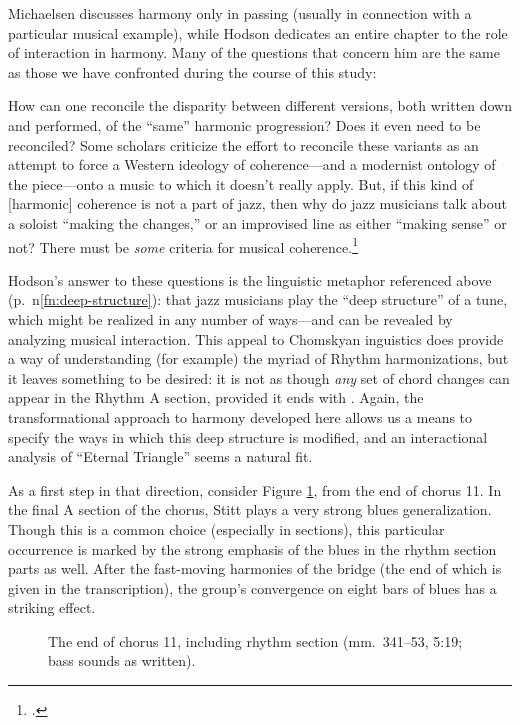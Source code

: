 Michaelsen discusses harmony only in passing (usually in connection with a
particular musical example), while Hodson dedicates an entire chapter to the
role of interaction in harmony. Many of the questions that concern
him are the same as those we have confronted during the course of this study:
\begin{quoting}
  \singlespacing
  How can one reconcile the disparity between different versions, both written
  down and performed, of the ``same'' harmonic progression? Does it even need
  to be reconciled? Some scholars criticize the effort to reconcile these
  variants as an attempt to force a Western ideology of coherence---and a
  modernist ontology of the piece---onto a music to which it doesn't really
  apply. But, if this kind of [harmonic] coherence is not a part of jazz, then
  why do jazz musicians talk about a soloist ``making the changes,'' or an
  improvised line as either ``making sense'' or not? There must be \emph{some}
  criteria for musical coherence.\footcite[53]{hodson:2007}
\end{quoting}
%
Hodson's answer to these questions is the linguistic metaphor referenced above
(p.~\pageref{fn:deep-structure}n\ref{fn:deep-structure}): that jazz musicians
play the ``deep structure'' of a tune, which might be realized in any number
of ways---and can be revealed by analyzing musical interaction. This appeal to
Chomskyan inguistics does provide a way of understanding (for example) the
myriad of Rhythm harmonizations, but it leaves something to be desired: it is
not as though \emph{any} set of chord changes can appear in the Rhythm A
section, provided it ends with \Bflat. Again, the transformational approach to
harmony developed here allows us a means to specify the ways in which this
deep structure is modified, and an interactional analysis of ``Eternal
Triangle'' seems a natural fit.

As a first step in that direction, consider Figure \ref{et:rhythm-sect-11},
from the end of chorus 11. In the final A section of the chorus, Stitt plays a
very strong blues generalization. Though this is a common choice (especially
in  sections), this particular occurrence is marked by the strong
emphasis of the blues in the rhythm section parts as well. After the
fast-moving harmonies of the bridge (the end of which is given in the
transcription), the group's convergence on eight bars of blues has a striking
effect.

\begin{figure}[tbp]
  \caption[The end of chorus 11, including rhythm section.]{%
    The end of chorus 11, including rhythm section (mm.~341--53, 5:19; bass
    sounds as written).}
  \label{et:rhythm-sect-11}
\end{figure}

